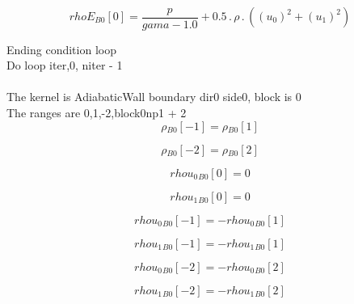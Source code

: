 \documentclass{article}
\begin{document}
\begin{dmath}{rhoE{_{B0}}}[{0}] = \frac{p}{gama - 1.0} + 0.5 \,.\, \rho \,.\, \left(\left(u_{0} \right)^{2} + \left(u_{1} \right)^{2}\right)\end{dmath}

\noindent Ending condition loop %
\\\noindent Do loop iter,0, niter - 1\\
\\\noindent The kernel is AdiabaticWall boundary dir0 side0, block is 0\\\noindent The ranges are 0,1,-2,block0np1 + 2\\\begin{dmath}{\rho{_{B0}}}[{-1}] = {\rho{_{B0}}}[{1}]\end{dmath}

\begin{dmath}{\rho{_{B0}}}[{-2}] = {\rho{_{B0}}}[{2}]\end{dmath}

\begin{dmath}{rhou_{0}{_{B0}}}[{0}] = 0\end{dmath}

\begin{dmath}{rhou_{1}{_{B0}}}[{0}] = 0\end{dmath}

\begin{dmath}{rhou_{0}{_{B0}}}[{-1}] = - {rhou_{0}{_{B0}}}[{1}]\end{dmath}

\begin{dmath}{rhou_{1}{_{B0}}}[{-1}] = - {rhou_{1}{_{B0}}}[{1}]\end{dmath}

\begin{dmath}{rhou_{0}{_{B0}}}[{-2}] = - {rhou_{0}{_{B0}}}[{2}]\end{dmath}

\begin{dmath}{rhou_{1}{_{B0}}}[{-2}] = - {rhou_{1}{_{B0}}}[{2}]\end{dmath}
\end{document}
